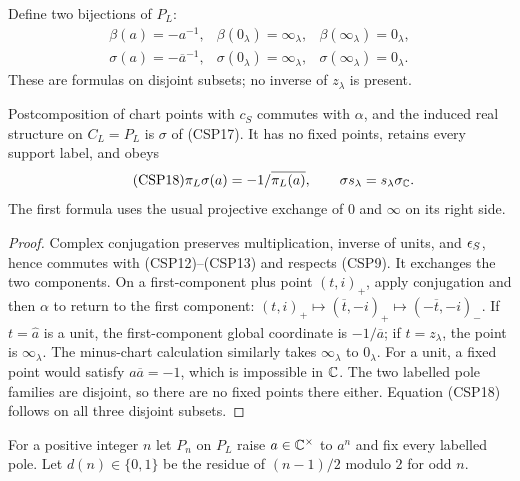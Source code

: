 Define two bijections of $P_L$:
\begin{equation}\tag{CSP17}
 \begin{array}{lll}
 \beta(a)=-a^{-1},&\beta(0_\lambda)=\infty_\lambda,
                      &\beta(\infty_\lambda)=0_\lambda,\\
 \sigma(a)=-\overline a^{-1},&\sigma(0_\lambda)=\infty_\lambda,
                      &\sigma(\infty_\lambda)=0_\lambda.
 \end{array}
\end{equation}
These are formulas on disjoint subsets; no inverse of $z_\lambda$
is present.

\begin{theorem}\label{thm:real}
Postcomposition of chart points with $c_S$ commutes with $\alpha$,
and the induced real structure on $C_L=P_L$ is $\sigma$ of (CSP17).
It has no fixed points, retains every support label, and obeys
\begin{equation}\tag{CSP18}
 \pi_L\sigma(a)=-1/\overline{\pi_L(a)},\qquad
 \sigma s_\lambda=s_\lambda\sigma_{\mathbb C}.
\end{equation}
The first formula uses the usual projective exchange of $0$ and
$\infty$ on its right side.
\end{theorem}
\begin{proof}
Complex conjugation preserves multiplication, inverse of units, and
$\epsilon_S$, hence commutes with (CSP12)--(CSP13) and respects (CSP9).
It exchanges the two components.  On a first-component plus point
$(t,i)_+$, apply conjugation and then $\alpha$ to return to the first
component: $(t,i)_+\mapsto(\overline t,-i)_+
\mapsto(-\overline t,-i)_-$.  If $t=\widehat a$ is a unit, the
first-component global coordinate is $-1/\overline a$; if
$t=z_\lambda$, the point is $\infty_\lambda$.  The minus-chart
calculation similarly takes $\infty_\lambda$ to $0_\lambda$.
For a unit, a fixed point would satisfy $a\overline a=-1$, which is
impossible in $\mathbb C$.  The two labelled pole families are disjoint,
so there are no fixed points there either.  Equation (CSP18) follows
on all three disjoint subsets.
\end{proof}

For a positive integer $n$ let $P_n$ on $P_L$ raise $a\in\mathbb C^\times$
to $a^n$ and fix every labelled pole.  Let
$d(n)\in\{0,1\}$ be the residue of $(n-1)/2$ modulo $2$ for odd
$n$.

